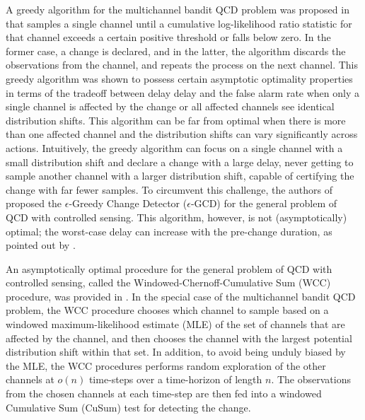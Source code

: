 \documentclass[letterpaper, 10 pt, conference]{ieeeconf}  %
\begin{document}
A greedy algorithm for the multichannel bandit QCD problem was proposed in \cite{xu2021optimum} that samples a single channel until a cumulative log-likelihood 
ratio statistic for that channel exceeds a certain positive threshold or falls below zero. In the former case, a change is declared, and in the latter, the algorithm discards the observations from the channel, and repeats the process on the next channel. This greedy algorithm was shown to possess certain asymptotic optimality properties in terms of the tradeoff between delay delay and the false alarm rate when only a single channel is affected by the change or all affected channels see identical distribution shifts. This algorithm can be far from optimal when there is more than one affected channel and the distribution shifts can vary significantly across actions. Intuitively, the greedy algorithm can focus on a single channel with a small distribution shift and declare a change with a large delay, never getting to sample another channel with a larger distribution shift, capable of certifying the change with far fewer samples. 
To circumvent this challenge, the authors of \cite{gopalan2021bandit} proposed the $\epsilon$-Greedy Change Detector ($\epsilon$-GCD) for the general problem of QCD with controlled sensing. This algorithm, however, is
not (asymptotically) optimal; the worst-case delay can increase with the pre-change duration, as pointed out by \cite{veeravalli2024quickest}. 

An asymptotically optimal procedure for the general problem of QCD with controlled sensing, called the Windowed-Chernoff-Cumulative Sum (WCC) procedure, was provided in \cite{veeravalli2024quickest}. In the special case of the multichannel bandit QCD problem, the WCC procedure chooses which channel to sample based on a windowed maximum-likelihood estimate (MLE) of the set of channels that are affected by the channel, and then chooses the channel with the largest potential distribution shift within that set.  In addition, to avoid being unduly biased by the MLE, the WCC procedures performs random exploration of the other channels at $o(n)$ time-steps over a time-horizon of length $n$. The observations from the chosen channels at each time-step are then fed into a windowed Cumulative Sum (CuSum) test for detecting the change.
\end{document}
